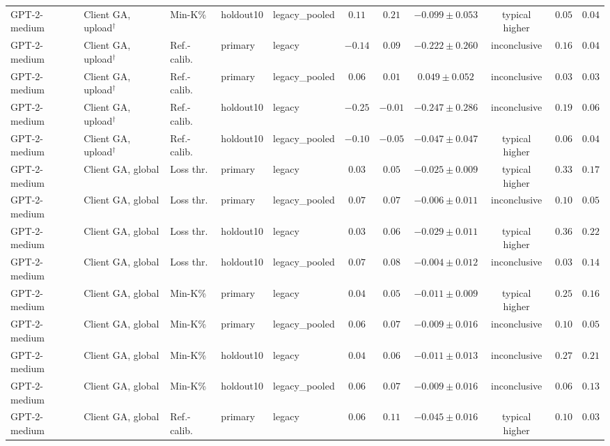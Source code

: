 \begin{table}[t]
\begin{tabular*}{\textwidth}{@{\extracolsep{\fill}}lllllcccccc@{}}
GPT-2-medium & Client GA, upload$^{\dagger}$ & Min-K\% & holdout10 & legacy\_pooled & $0.11$ & $0.21$ & $-0.099 \pm 0.053$ & typical higher & $0.05$ & $0.04$ \\
GPT-2-medium & Client GA, upload$^{\dagger}$ & Ref.-calib. & primary & legacy & $-0.14$ & $0.09$ & $-0.222 \pm 0.260$ & inconclusive & $0.16$ & $0.04$ \\
GPT-2-medium & Client GA, upload$^{\dagger}$ & Ref.-calib. & primary & legacy\_pooled & $0.06$ & $0.01$ & $0.049 \pm 0.052$ & inconclusive & $0.03$ & $0.03$ \\
GPT-2-medium & Client GA, upload$^{\dagger}$ & Ref.-calib. & holdout10 & legacy & $-0.25$ & $-0.01$ & $-0.247 \pm 0.286$ & inconclusive & $0.19$ & $0.06$ \\
GPT-2-medium & Client GA, upload$^{\dagger}$ & Ref.-calib. & holdout10 & legacy\_pooled & $-0.10$ & $-0.05$ & $-0.047 \pm 0.047$ & typical higher & $0.06$ & $0.04$ \\
GPT-2-medium & Client GA, global & Loss thr. & primary & legacy & $0.03$ & $0.05$ & $-0.025 \pm 0.009$ & typical higher & $0.33$ & $0.17$ \\
GPT-2-medium & Client GA, global & Loss thr. & primary & legacy\_pooled & $0.07$ & $0.07$ & $-0.006 \pm 0.011$ & inconclusive & $0.10$ & $0.05$ \\
GPT-2-medium & Client GA, global & Loss thr. & holdout10 & legacy & $0.03$ & $0.06$ & $-0.029 \pm 0.011$ & typical higher & $0.36$ & $0.22$ \\
GPT-2-medium & Client GA, global & Loss thr. & holdout10 & legacy\_pooled & $0.07$ & $0.08$ & $-0.004 \pm 0.012$ & inconclusive & $0.03$ & $0.14$ \\
GPT-2-medium & Client GA, global & Min-K\% & primary & legacy & $0.04$ & $0.05$ & $-0.011 \pm 0.009$ & typical higher & $0.25$ & $0.16$ \\
GPT-2-medium & Client GA, global & Min-K\% & primary & legacy\_pooled & $0.06$ & $0.07$ & $-0.009 \pm 0.016$ & inconclusive & $0.10$ & $0.05$ \\
GPT-2-medium & Client GA, global & Min-K\% & holdout10 & legacy & $0.04$ & $0.06$ & $-0.011 \pm 0.013$ & inconclusive & $0.27$ & $0.21$ \\
GPT-2-medium & Client GA, global & Min-K\% & holdout10 & legacy\_pooled & $0.06$ & $0.07$ & $-0.009 \pm 0.016$ & inconclusive & $0.06$ & $0.13$ \\
GPT-2-medium & Client GA, global & Ref.-calib. & primary & legacy & $0.06$ & $0.11$ & $-0.045 \pm 0.016$ & typical higher & $0.10$ & $0.03$ \\

\end{tabular*}
\end{table}
